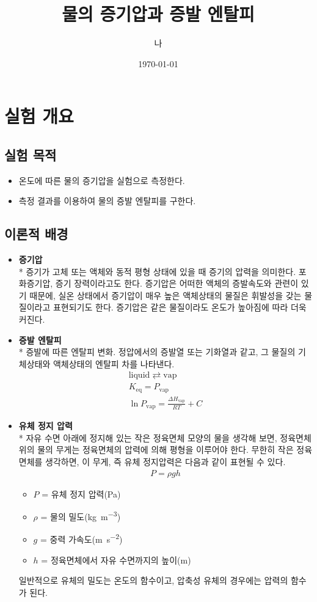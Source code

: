 \documentclass[a4paper,10pt]{article}
\title{물의 증기압과 증발 엔탈피}
\begin{document}
	\author{나}
	\date{\today}
	\maketitle
	\section{실험 개요}
	
	\subsection{실험 목적}
	\begin{itemize}
		\item 온도에 따른 물의 증기압을 실험으로 측정한다.
		\item 측정 결과를 이용하여 물의 증발 엔탈피를 구한다.
	\end{itemize}
	
	\subsection{이론적 배경}
	\begin{itemize}
		\item {\bf 증기압} \\*
		증기가 고체 또는 액체와 동적 평형 상태에 있을 때 증기의 압력을 의미한다. 포화증기압, 증기 장력이라고도 한다. 증기압은 어떠한 액체의 증발속도와 관련이 있기 때문에, 실온 상태에서 증기압이 매우 높은 액체상태의 물질은 휘발성을 갖는 물질이라고 표현되기도 한다. 증기압은 같은 물질이라도 온도가 높아짐에 따라 더욱 커진다.
		\item {\bf 증발 엔탈피} \\*
		증발에 따른 엔탈피 변화. 정압에서의 증발열 또는 기화열과 같고, 그 물질의 기체상태와 액체상태의 엔탈피 차를 나타낸다.
		\begin{gather*}
			\mathrm{liquid} \rightleftarrows \mathrm{vap} \\
			K_{\mathrm{eq}} = P_{\mathrm{vap}} \\
			\ln P_{\mathrm{vap}} = \frac{\Delta H_{\mathrm{vap}}}{RT} + C
		\end{gather*}
		\item {\bf 유체 정지 압력} \\*
		자유 수면 아래에 정지해 있는 작은 정육면체 모양의 물을 생각해 보면, 정육면체 위의 물의 무게는 정육면체의 압력에 의해 평형을 이루어야 한다. 무한히 작은 정육면체를 생각하면, 이 무게, 즉 유체 정지압력은 다음과 같이 표현될 수 있다.
		\begin{gather*}
			P = \rho gh
		\end{gather*}
		\begin{itemize}
			\item $P$ = 유체 정지 압력(\si{\pascal})
			\item$\rho$ = 물의 밀도(\si{\kilo\gram\per\cubic\metre})
			\item$g$ = 중력 가속도(\si{\metre\per\square\second})
			\item $h$ = 정육면체에서 자유 수면까지의 높이(\si{\metre})
		\end{itemize}
		일반적으로 유체의 밀도는 온도의 함수이고, 압축성 유체의 경우에는 압력의 함수가 된다.
	\end{itemize}
	
\end{document}
